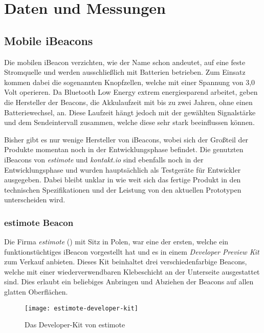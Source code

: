 \chapter{Daten und Messungen}
\label{chap:dataandmeasure}

\section{Mobile iBeacons}
\label{sec:dataandmeasurement:mobilebeacon}
Die mobilen iBeacon verzichten, wie der Name schon andeutet, auf eine feste Stromquelle und werden ausschließlich mit Batterien betrieben.
Zum Einsatz kommen dabei die sogenannten Knopfzellen, welche mit einer Spannung von 3,0 Volt operieren.
Da Bluetooth Low Energy extrem energiesparend arbeitet, geben die Hersteller der Beacons, die Akkulaufzeit mit bis zu zwei Jahren, ohne einen Batteriewechsel, an. Diese Laufzeit hängt jedoch mit der gewählten Signalstärke und dem Sendeintervall zusammen, welche diese sehr stark beeinflussen können.

Bisher gibt es nur wenige Hersteller von iBeacons, wobei sich der Großteil der Produkte momentan noch in der Entwicklungsphase befindet. Die genutzten iBeacons von \emph{estimote} und \emph{kontakt.io} sind ebenfalls noch in der Entwicklungsphase und wurden hauptsächlich als Testgeräte für Entwickler ausgegeben. Dabei bleibt unklar in wie weit sich das fertige Produkt in den technischen Spezifikationen und der Leistung von den aktuellen Prototypen unterscheiden wird.

\subsection{estimote Beacon}
\label{sec:dataandmeasurement:mobilebeacon:estimote}
Die Firma \emph{estimote} (\citet{estimote}) mit Sitz in Polen, war eine der ersten, welche ein funktionstüchtiges iBeacon vorgestellt hat und es in einem \emph{Developer Preview Kit} zum Verkauf anbieten.
Dieses Kit beinhaltet drei verschiedenfarbige Beacons, welche mit einer wiederverwendbaren Klebeschicht an der Unterseite ausgestattet sind. Dies erlaubt ein beliebiges Anbringen und Abziehen der Beacons auf allen glatten Oberflächen.
\begin{figure}[htb!]
		\centering
	\texttt{[image: estimote-developer-kit]}
	\caption{Das Developer-Kit von estimote}
	\label{estimote-developer-kit}
\end{figure}

